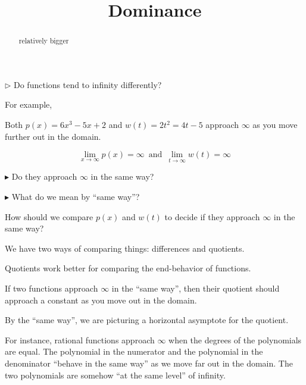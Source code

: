 \documentclass{ximera}
\title{Dominance}
\begin{document}
\begin{abstract}
relatively bigger
\end{abstract}
\maketitle







\textbf{\textcolor{red!70!black}{$\rhd$}} Do functions tend to infinity differently? 



For example,

Both $p(x) = 6x^3 - 5x + 2$ and $w(t) = 2t^2 = 4t - 5$ approach $\infty$ as you move further out in the domain.



\[    \lim_{x \to \infty} p(x) = \infty  \, \text{ and }  \,       \lim_{t \to \infty} w(t) = \infty                \]

\textbf{\textcolor{blue!55!black}{$\blacktriangleright$}} Do they approach $\infty$ in the same way? 

\textbf{\textcolor{blue!55!black}{$\blacktriangleright$}} What do we mean by ``same way''?  



How should we compare $p(x)$ and $w(t)$ to decide if they approach $\infty$ in the same way?  


We have two ways of comparing things: differences and quotients. 

Quotients work better for comparing the end-behavior of functions. 

If two functions approach $\infty$ in the ``same way'', then their quotient should approach a constant as you move out in the domain.

By the ``same way'', we are picturing a horizontal asymptote for the quotient.

For instance, rational functions approach $\infty$ when the degrees of the polynomials are equal.   The polynomial in the numerator and the polynomial in the denominator ``behave in the same way'' as we move far out in the domain.  The two polynomials are somehow ``at the same level'' of infinity. 
\end{document}
